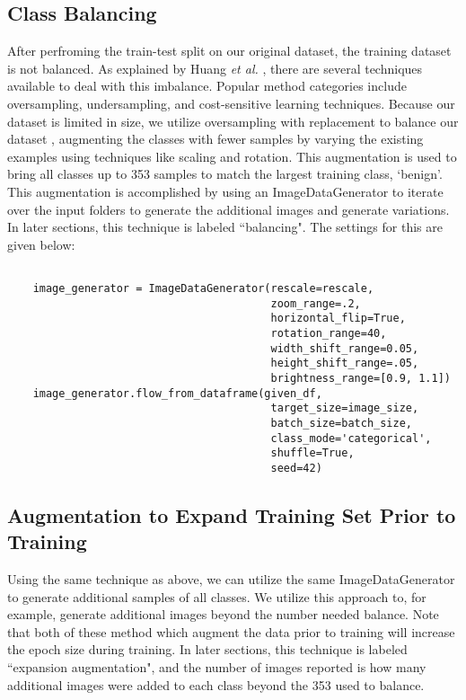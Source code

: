 \documentclass[sn-mathphys,Numbered]{sn-jnl}%
\theoremstyle{thmstyleone}%
\theoremstyle{thmstyletwo}%
\theoremstyle{thmstylethree}%
\begin{document}
\subsection{Class Balancing}
After perfroming the train-test split on our original dataset, the training dataset is not balanced.  
As explained by Huang {\it et al.} \cite{Huang_2016_CVPR}, there are several techniques available to deal with this imbalance.  Popular method categories include oversampling, undersampling, and cost-sensitive learning techniques.  Because our dataset is limited in size, we utilize oversampling with replacement to balance our dataset \cite{Huang_2016_CVPR}, augmenting the classes with fewer samples \cite{tensorflow-imagedatagenerator} by varying the existing examples using techniques like scaling and rotation.  This augmentation is used to bring all classes up to 353 samples to match the largest training class, `benign'.  This augmentation is accomplished by using an ImageDataGenerator \cite{tensorflow-imagedatagenerator} to iterate over the input folders to generate the additional images and generate variations.  In later sections, this technique is labeled ``balancing".  The settings for this are given below:
\begin{lstlisting}

    image_generator = ImageDataGenerator(rescale=rescale,
                                         zoom_range=.2,
                                         horizontal_flip=True,
                                         rotation_range=40,
                                         width_shift_range=0.05,
                                         height_shift_range=.05,
                                         brightness_range=[0.9, 1.1])
    image_generator.flow_from_dataframe(given_df,
                                         target_size=image_size,
                                         batch_size=batch_size,
                                         class_mode='categorical',
                                         shuffle=True,
                                         seed=42)
\end{lstlisting}

\subsection{Augmentation to Expand Training Set Prior to Training}
Using the same technique as above, we can utilize the same ImageDataGenerator to generate additional samples of all classes.  We utilize this approach to, for example, generate additional images beyond the number needed balance.  Note that both of these method which augment the data prior to training will increase the epoch size during training.   In later sections, this technique is labeled ``expansion augmentation", and the number of images reported is how many additional images were added to each class beyond the 353 used to balance. 
\end{document}

